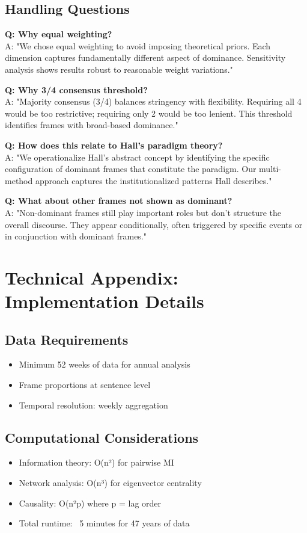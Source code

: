 \documentclass[11pt]{article}
\begin{document}
\subsection{Handling Questions}

\textbf{Q: Why equal weighting?}\\
A: "We chose equal weighting to avoid imposing theoretical priors. Each dimension captures fundamentally different aspect of dominance. Sensitivity analysis shows results robust to reasonable weight variations."

\textbf{Q: Why 3/4 consensus threshold?}\\
A: "Majority consensus (3/4) balances stringency with flexibility. Requiring all 4 would be too restrictive; requiring only 2 would be too lenient. This threshold identifies frames with broad-based dominance."

\textbf{Q: How does this relate to Hall's paradigm theory?}\\
A: "We operationalize Hall's abstract concept by identifying the specific configuration of dominant frames that constitute the paradigm. Our multi-method approach captures the institutionalized patterns Hall describes."

\textbf{Q: What about other frames not shown as dominant?}\\
A: "Non-dominant frames still play important roles but don't structure the overall discourse. They appear conditionally, often triggered by specific events or in conjunction with dominant frames."

\section{Technical Appendix: Implementation Details}

\subsection{Data Requirements}
\begin{itemize}
    \item Minimum 52 weeks of data for annual analysis
    \item Frame proportions at sentence level
    \item Temporal resolution: weekly aggregation
\end{itemize}

\subsection{Computational Considerations}
\begin{itemize}
    \item Information theory: O(n²) for pairwise MI
    \item Network analysis: O(n³) for eigenvector centrality
    \item Causality: O(n²p) where p = lag order
    \item Total runtime: ~5 minutes for 47 years of data
\end{itemize}
\end{document}
